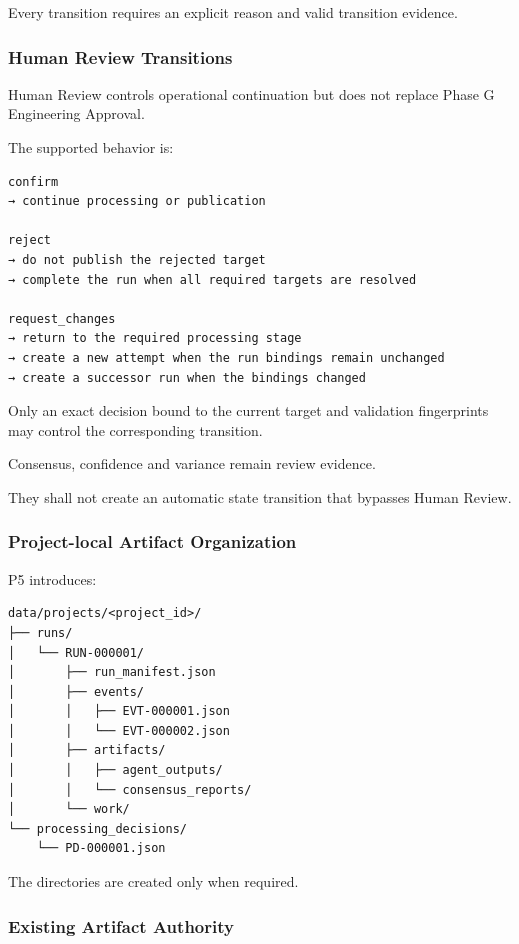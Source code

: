 Every transition requires an explicit reason and valid transition evidence.

\hypertarget{human-review-transitions}{%
\subsubsection{Human Review Transitions}\label{human-review-transitions}}

Human Review controls operational continuation but does not replace Phase G Engineering Approval.

The supported behavior is:

\begin{verbatim}
confirm
→ continue processing or publication

reject
→ do not publish the rejected target
→ complete the run when all required targets are resolved

request_changes
→ return to the required processing stage
→ create a new attempt when the run bindings remain unchanged
→ create a successor run when the bindings changed
\end{verbatim}

Only an exact decision bound to the current target and validation fingerprints may control the corresponding transition.

Consensus, confidence and variance remain review evidence.

They shall not create an automatic state transition that bypasses Human Review.

\hypertarget{project-local-artifact-organization}{%
\subsubsection{Project-local Artifact Organization}\label{project-local-artifact-organization}}

P5 introduces:

\begin{verbatim}
data/projects/<project_id>/
├── runs/
│   └── RUN-000001/
│       ├── run_manifest.json
│       ├── events/
│       │   ├── EVT-000001.json
│       │   └── EVT-000002.json
│       ├── artifacts/
│       │   ├── agent_outputs/
│       │   └── consensus_reports/
│       └── work/
└── processing_decisions/
    └── PD-000001.json
\end{verbatim}

The directories are created only when required.

\hypertarget{existing-artifact-authority}{%
\subsubsection{Existing Artifact Authority}\label{existing-artifact-authority}}

